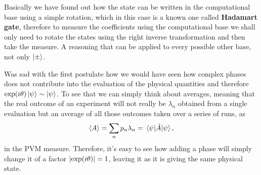 Basically we have found out how the state can be written in the computational base using a simple rotation, which in this case is a known one called \textbf{Hadamart gate}, therefore to measure the coefficients using the computational base we shall only need to rotate the states using the right inverse transformation and then take the measure. A reasoning that can be applied to every possible other base, not only $\ket{\pm}$.

\nt
{
    Was sad with the first postulate how we would have seen how complex phases does not contribute into the evaluation of the physical quantities and therefore $\exp(i\theta)\ket{\psi} \sim \ket{\psi}$. To see that we can simply think about averages, meaning that the real outcome of an experiment will not really be $\lambda_n$ obtained from a single evaluation but an average of all those outcomes taken over a series of runs, as
    \begin{equation}
        \left\langle A \right\rangle = \sum_n p_n \lambda_n = \ev{\hat{A}}{\psi},
    \end{equation}
    in the PVM measure. Therefore, it's easy to see how adding a phase will simply change it of a factor $\abs{\exp(i\theta)} = 1$, leaving it as it is giving the same physical state.
}